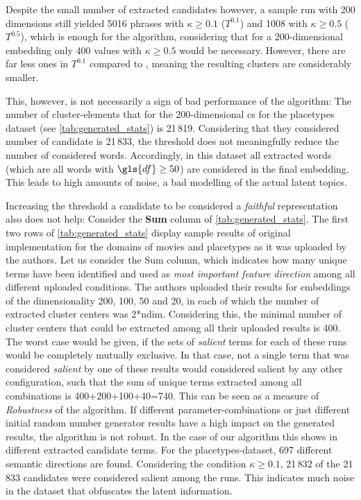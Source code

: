 
Despite the small number of extracted candidates however, a sample run with 200 dimensions still yielded 5016 phrases with $\kappa \geq 0.1$ ($T^{0.1}$) and 1008 with $\kappa \geq 0.5$ ($T^{0.5}$), which is enough for the algorithm, considering that for a 200-dimensional embedding only 400 values with $\kappa \geq 0.5$ would be necessary. However, there are far less ones in $T^{0.1}$ compared to \textcite{Derrac2015}, meaning the resulting clusters are considerably smaller. 

This, however, is not necessarily a sign of bad performance of the algorithm: The number of cluster-elements that \cite{Derrac2015} for the 200-dimensional \gls{cs} for the placetypes dataset (see \autoref{tab:generated_stats}) is 21\,819. Considering that they considered  number of candidate is 21\,833, the threshold does not meaningfully reduce the number of considered words. Accordingly, in this dataset all extracted words (which are all words with $\gls{df} \geq 50$) are considered in the final embedding. This leads to high amounts of noise, \ie a bad modelling of the actual latent topics. 

Increasing the threshold a candidate to be considered a \textit{faithful} representation also does not help: Consider the \textbf{Sum} column of \autoref{tab:generated_stats}. The first two rows of \autoref{tab:generated_stats} display sample results of  original implementation for the domains of movies and placetypes as it was uploaded by the authors. Let us consider the Sum column, which indicates how many unique terms have been identified and used as \textit{most important feature direction} among all different uploaded conditions. The authors uploaded their results for embeddings of the dimensionality 200, 100, 50 and 20, in each of which the number of extracted cluster centers  was 2*ndim. Considering this, the minimal number of cluster centers that could be extracted among all their uploaded results is 400. The worst case would be given, if the sets of \textit{salient} terms for each of these runs would be completely mutually exclusive. In that case, not a single term that was considered \textit{salient} by one of these results would considered salient by any other configuration, such that the sum of unique terms extracted among all combinations is 400+200+100+40=740. This can be seen as a measure of \textit{Robustness} of the algorithm. If different parameter-combinations or just different initial random number generator results have a high impact on the generated results, the algorithm is not robust. In the case of our algorithm this shows in different extracted candidate terms. For the placetypes-dataset, 697 different semantic directions are found. Considering the condition $\kappa \geq 0.1$, 21\,832 of the 21\,833 candidates were considered salient among the runs. This indicates much noise in the dataset that obfuscates the latent information.

